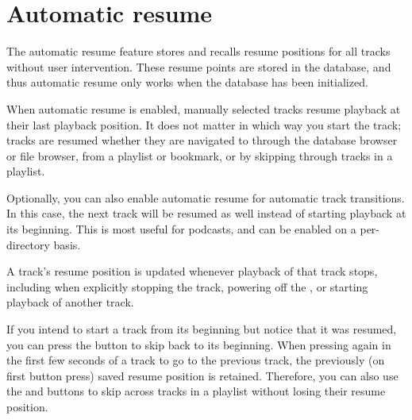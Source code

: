 \section{\label{ref:Autoresumeconfigactual}Automatic resume}

The automatic resume feature stores and recalls resume positions for
all tracks without user intervention.  These resume points are stored
in the database, and thus automatic resume only works when the
database has been initialized.

When automatic resume is enabled, manually selected tracks resume
playback at their last playback position.  It does not matter in which
way you start the track; tracks are resumed whether they are navigated
to through the database browser or file browser, from a playlist or
bookmark, or by skipping through tracks in a playlist.

Optionally, you can also enable automatic resume for automatic track
transitions.  In this case, the next track will be resumed as well
instead of starting playback at its beginning.  This is most useful
for podcasts, and can be enabled on a per-directory basis.

A track's resume position is updated whenever playback of that track
stops, including when explicitly stopping the track, powering off the
\dap{}, or starting playback of another track.

If you intend to start a track from its beginning but notice that it
was resumed, you can press the \ButtonLeft{} button to skip back to
its beginning.  When pressing \ButtonLeft{} again in the first few
seconds of a track to go to the previous track, the previously (on
first button press) saved resume position is retained.  Therefore, you
can also use the \ButtonLeft{} and \ButtonRight{} buttons to skip
across tracks in a playlist without losing their resume position.

